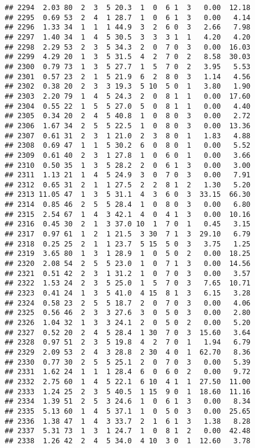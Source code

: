 \documentclass[
]{article}
\begin{document}
\begin{verbatim}
## 2294  2.03 80  2  3  5 20.3  1  0  6 1  3   0.00  12.18
## 2295  0.69 53  2  4  1 28.7  1  0  6 1  3   0.00   4.14
## 2296  1.33 34  1  1  1 44.9  3  2  6 0  3   2.66   7.98
## 2297  1.40 34  1  4  5 30.5  3  3  3 1  1   4.20   4.20
## 2298  2.29 53  2  3  5 34.3  2  0  7 0  3   0.00  16.03
## 2299  4.29 20  1  3  5 31.5  4  2  7 0  2   8.58  30.03
## 2300  0.79 73  1  3  5 27.7  1  5  7 0  2   3.95   5.53
## 2301  0.57 23  2  1  5 21.9  6  2  8 0  3   1.14   4.56
## 2302  0.38 20  2  3  3 19.3  5 10  5 0  1   3.80   1.90
## 2303  2.20 79  1  4  5 24.3  2  0  8 1  1   0.00  17.60
## 2304  0.55 22  1  5  5 27.0  5  0  8 1  1   0.00   4.40
## 2305  0.34 20  2  4  5 40.8  1  0  8 0  3   0.00   2.72
## 2306  1.67 34  2  5  5 22.5  1  0  8 0  3   0.00  13.36
## 2307  0.61 31  2  3  1 21.0  2  3  8 0  1   1.83   4.88
## 2308  0.69 47  1  1  5 30.2  6  0  8 0  1   0.00   5.52
## 2309  0.61 40  2  3  1 27.8  1  0  6 0  1   0.00   3.66
## 2310  0.50 35  1  3  5 28.2  2  0  6 1  3   0.00   3.00
## 2311  1.13 21  1  4  5 24.9  3  0  7 0  3   0.00   7.91
## 2312  0.65 31  2  1  1 27.5  2  2  8 1  2   1.30   5.20
## 2313 11.05 47  1  3  5 31.1  4  3  6 0  3  33.15  66.30
## 2314  0.85 46  2  5  5 28.4  1  0  8 0  3   0.00   6.80
## 2315  2.54 67  1  4  3 42.1  4  0  4 1  3   0.00  10.16
## 2316  0.45 30  2  1  3 37.0 10  1  7 0  1   0.45   3.15
## 2317  0.97 61  1  2  1 21.5  3 30  7 1  3  29.10   6.79
## 2318  0.25 25  2  1  1 23.7  5 15  5 0  3   3.75   1.25
## 2319  3.65 80  1  3  1 28.9  1  0  5 0  2   0.00  18.25
## 2320  2.08 54  2  5  5 23.0  1  0  7 1  3   0.00  14.56
## 2321  0.51 42  2  3  1 31.2  1  0  7 0  3   0.00   3.57
## 2322  1.53 24  2  3  5 25.0  1  5  7 0  3   7.65  10.71
## 2323  0.41 24  1  3  5 41.0  4 15  8 1  3   6.15   3.28
## 2324  0.58 23  2  5  5 18.7  2  0  7 0  3   0.00   4.06
## 2325  0.56 46  2  3  3 27.6  3  0  5 0  3   0.00   2.80
## 2326  1.04 32  1  3  3 24.1  2  0  5 0  2   0.00   5.20
## 2327  0.52 20  2  4  5 28.4  1 30  7 0  3  15.60   3.64
## 2328  0.97 51  2  3  5 19.8  4  2  7 0  1   1.94   6.79
## 2329  2.09 53  2  4  3 28.8  2 30  4 0  1  62.70   8.36
## 2330  0.77 30  2  5  5 25.1  2  0  7 0  3   0.00   5.39
## 2331  1.62 24  1  1  1 28.4  6  0  6 0  2   0.00   9.72
## 2332  2.75 60  1  4  5 22.1  6 10  4 1  1  27.50  11.00
## 2333  1.24 25  2  3  5 40.5  1 15  9 0  1  18.60  11.16
## 2334  1.39 51  2  5  3 24.6  1  0  6 1  3   0.00   8.34
## 2335  5.13 60  1  4  5 37.1  1  0  5 0  3   0.00  25.65
## 2336  1.38 47  1  4  3 33.7  2  1  6 1  3   1.38   8.28
## 2337  5.31 73  1  3  1 24.7  1  0  8 1  2   0.00  42.48
## 2338  1.26 42  2  4  5 34.0  4 10  3 0  1  12.60   3.78

\end{verbatim}
\end{document}
